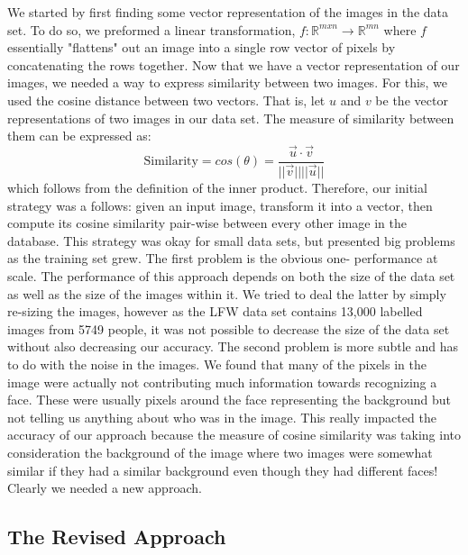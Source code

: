 \documentclass[letterpaper, 11pt, conference]{ieeeconf}
\begin{document}
We started by first finding some vector representation of the images in the data set. To do so, we preformed a
linear transformation, $f: \mathbb{R}^{m x n} \rightarrow \mathbb{R}^{mn}$ where $f$ essentially "flattens"
out an image into a single row vector of pixels by concatenating the rows together. Now that we have a vector
representation of our images, we needed a way to express similarity between two images. For this, we used the
cosine distance between two vectors. That is, let $u$ and $v$ be the vector representations of two images in our data set.
The measure of similarity between them can be expressed as:
$$\text{Similarity} = cos(\theta) = \frac{\vec{u} \cdot \vec{v}}{||\vec{v}|| ||\vec{u}||}$$
which follows from the definition of the inner product. Therefore, our initial
strategy was a follows: given an input image, transform it into a vector, then
compute its cosine similarity pair-wise between every other image in the database.
This strategy was okay for small data sets, but presented big problems as the
training set grew. The first problem is the obvious one- performance at scale. The performance
of this approach depends on both the size of the data set as well as the size of
the images within it. We tried to deal the latter by simply re-sizing the
images, however as the LFW data set contains 13,000 labelled images from 5749
people, it was not possible to decrease the size of the data set without also
decreasing our accuracy. The second problem is more subtle and has to do with
the noise in the images. We found that many of the pixels in the image were
actually not contributing much information towards recognizing a face. These
were usually pixels around the face representing the background but not telling
us anything about who was in the image. This really impacted the accuracy of our
approach because the measure of cosine similarity was taking into consideration
the background of the image where two images were somewhat similar if they had a
similar background even though they had different faces! Clearly we needed a new
approach.

\subsection{The Revised Approach}
\end{document}
